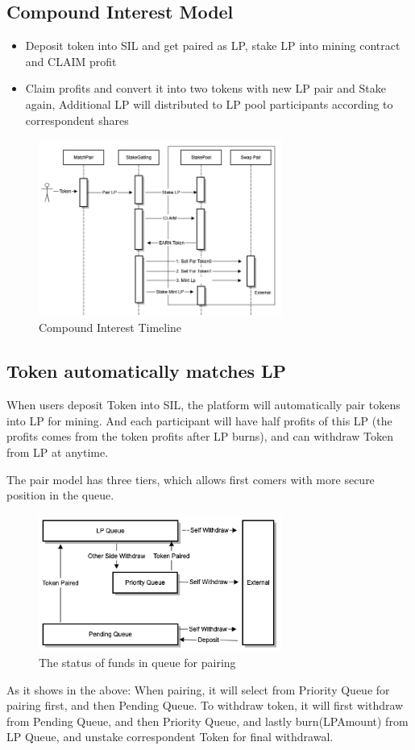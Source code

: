 \documentclass[11pt,letterpaper]{article}
\begin{document}
\begin{multicols}{2}
\subsection{Compound Interest Model}
\begin{itemize}
  \item Deposit token into SIL and get paired as LP, stake LP into mining contract and CLAIM profit
  \item Claim profits and convert it into two tokens with new LP pair and Stake again, Additional LP will distributed to LP pool participants according to correspondent shares
\end{itemize}
\begin{figure}[H]
\centering
\includegraphics[width=8cm]{img/harvest1.png}
\caption{Compound Interest Timeline}
\label{fig:rc}
\end{figure}

\subsection{Token automatically matches LP}
When users deposit Token into SIL, the platform will automatically pair tokens into LP for mining. And each participant will have half profits of this LP (the profits comes from the token profits after LP burns), and can withdraw Token from LP at anytime.

The pair model has three tiers, which allows first comers with more secure position in the queue.
\begin{figure}[H]
\centering
\includegraphics[width=8cm]{img/harvest2.png}
\caption{The status of funds in queue for pairing}
\label{fig:rc}
\end{figure}
As it shows in the above:
When pairing, it will select from Priority Queue for pairing first, and then Pending Queue.
To withdraw token, it will first withdraw from Pending Queue, and then Priority Queue, and lastly burn(LPAmount) from LP Queue, and unstake correspondent Token for final withdrawal.


\end{multicols}
\end{document}

